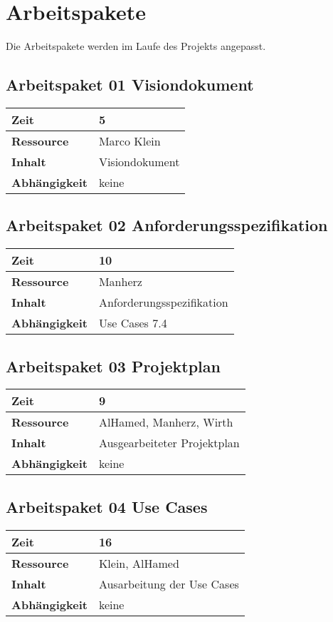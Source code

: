 \documentclass[12pt,a4paper,onecolumn]{article}
\begin{document}
\section{Arbeitspakete}
Die Arbeitspakete werden im Laufe des Projekts angepasst.
\subsection{Arbeitspaket 01 Visiondokument}
\begin{tabularx}{\textwidth}{|l|X|}
\hline
     \textbf{Zeit} &  5 \\
     \hline
     \textbf{Ressource} & Marco Klein\\
     \hline
     \textbf{Inhalt} & Visiondokument \\
     \hline
     \textbf{Abhängigkeit} &  keine\\
\hline
\end{tabularx}
\subsection{Arbeitspaket 02 Anforderungsspezifikation}
\begin{tabularx}{\textwidth}{|l|X|}
\hline
     \textbf{Zeit} &  10\\
     \hline
     \textbf{Ressource} & Manherz\\
     \hline
     \textbf{Inhalt} & Anforderungsspezifikation \\
     \hline
     \textbf{Abhängigkeit} & Use Cases 7.4\\
\hline
\end{tabularx}
\subsection{Arbeitspaket 03 Projektplan}
\begin{tabularx}{\textwidth}{|l|X|}
\hline
     \textbf{Zeit} &  9\\
     \hline
     \textbf{Ressource} & AlHamed, Manherz, Wirth\\
     \hline
     \textbf{Inhalt} &  Ausgearbeiteter Projektplan\\
     \hline
     \textbf{Abhängigkeit} & keine\\
\hline
\end{tabularx}
\subsection{Arbeitspaket 04 Use Cases}
\begin{tabularx}{\textwidth}{|l|X|}
\hline
     \textbf{Zeit} &  16\\
     \hline
     \textbf{Ressource} & Klein, AlHamed\\
     \hline
     \textbf{Inhalt} &  Ausarbeitung der Use Cases\\
     \hline
     \textbf{Abhängigkeit} & keine\\
\hline
\end{tabularx}
\end{document}
